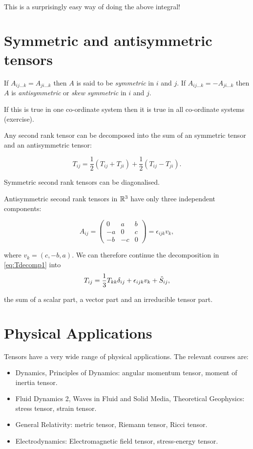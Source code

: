 \documentclass{notes}
\theoremstyle{plain}
\begin{document}
This is a surprisingly easy way of doing the above integral!

\section{Symmetric and antisymmetric tensors}

If $A_{i j \dots k} = A_{j i \dots k}$ then $A$ is said to be
\emph{symmetric} in $i$ and $j$.  If $A_{i j \dots k} = - A_{j i \dots k}$
then $A$ is \emph{antisymmetric} or \emph{skew symmetric} in $i$ and
$j$.

If this is true in one co-ordinate system then it is true in all
co-ordinate systems (exercise).

Any second rank tensor can be decomposed into the sum of an
symmetric tensor and an antisymmetric tensor:

\begin{equation}\label{eq:Tdecomp1}
T_{ij} = \frac{1}{2} ( T_{ij} + T_{ji}) + \frac{1}{2} (T_{ij} - T_{ji}).
\end{equation}

Symmetric second rank tensors can be diagonalised.

Antisymmetric second rank tensors in $\mathbb{R}^3$ have only three
independent components:

\[
A_{ij} = \begin{pmatrix}
0 & a & b \\
-a & 0 & c \\
-b & -c & 0
\end{pmatrix} = \epsilon_{ijk} v_k,
\]

where $v_k = (c,-b,a)$.  We can therefore continue the decomposition
in \eqref{eq:Tdecomp1} into
\[
T_{ij} = \frac{1}{3} T_{kk} \delta_{ij} + \epsilon_{ijk} v_k + \Tilde{S}_{ij},
\]

the sum of a scalar part, a vector part and an irreducible tensor
part.

\section{Physical Applications}

Tensors have a very wide range of physical applications.  The relevant
courses are:

\begin{itemize}
\item Dynamics, Principles of Dynamics: angular momentum tensor, moment of
  inertia tensor.
\item Fluid Dynamics 2, Waves in Fluid and Solid Media, Theoretical
  Geophysics: stress tensor, strain tensor.
\item General Relativity: metric tensor, Riemann tensor, Ricci tensor.
\item Electrodynamics: Electromagnetic field tensor, stress-energy tensor.
\end{itemize}
\end{document}
